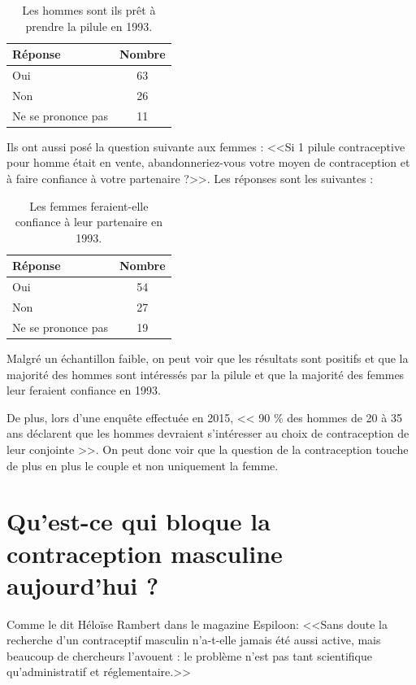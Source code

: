 \documentclass[12pt,a4paper]{report}
\begin{document}
\begin{table}[H]
\centering
\begin{tabular}{|l|c|}
\hline
\textbf{Réponse} & \textbf{Nombre} \\
\hline
Oui & 63 \\
Non & 26 \\
Ne se prononce pas & 11 \\
\hline
\end{tabular}
\caption{Les hommes sont ils prêt à prendre la pilule en 1993. \cite{PiluleMasculine1993}}
\end{table}

Ils ont aussi posé la question suivante aux femmes : <<Si 1 pilule contraceptive pour homme était en vente, abandonneriez-vous votre moyen de contraception et à faire confiance à votre partenaire ?>>. \cite{PiluleMasculine1993} Les réponses sont les suivantes :

\begin{table}[H]
\centering
\begin{tabular}{|l|c|}
\hline
\textbf{Réponse} & \textbf{Nombre} \\
\hline
Oui & 54 \\
Non & 27 \\
Ne se prononce pas & 19 \\
\hline
\end{tabular}
\caption{Les femmes feraient-elle confiance à leur partenaire en 1993. \cite{PiluleMasculine1993}}
\end{table}

Malgré un échantillon faible, on peut voir que les résultats sont positifs et que la majorité des hommes sont intéressés par la pilule et que la majorité des femmes leur feraient confiance en 1993.

De plus, lors d'une enquête effectuée en 2015, << 90 \% des hommes de 20 à 35 ans déclarent que les hommes devraient s’intéresser au choix de contraception de leur conjointe >>. \cite{JeunesFemmesSontelles2015} On peut donc voir que la question de la contraception touche de plus en plus le couple et non uniquement la femme.





\chapter{Qu'est-ce qui bloque la contraception masculine aujourd'hui ?}

Comme le dit Héloïse Rambert dans le magazine Espiloon: <<Sans doute la recherche d'un contraceptif masculin n'a-t-elle jamais été aussi active, mais beaucoup de chercheurs l'avouent : le problème n'est pas tant scientifique qu'administratif et réglementaire.>> \cites{heloiserambertPourquoiPiluleMasculine2023}
\end{document}

